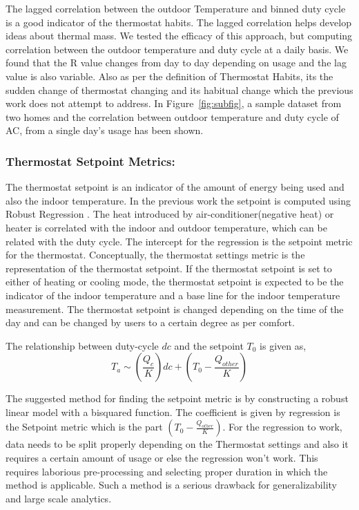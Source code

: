 \documentclass{sig-alternate}
\begin{document}
   

\indent The lagged correlation between the outdoor Temperature and binned duty cycle is a good indicator of the thermostat habits. The lagged correlation helps develop ideas about thermal mass. We tested the efficacy of this approach, but computing correlation between the outdoor temperature and duty cycle at a daily basis. We found that the R value changes from day to day depending on usage and the lag value is also variable. Also as per the definition of Thermostat Habits, its the sudden change of thermostat changing and its habitual change which the previous work does not attempt to address. In Figure~\ref{fig:subfig}, a sample dataset from two homes and the correlation between outdoor temperature and duty cycle of AC, from a single day's usage has been shown. 

\subsubsection{\textbf{Thermostat Setpoint Metrics:}} 

\indent The thermostat setpoint is an indicator of the amount of energy being used and also the indoor temperature. In the previous work the setpoint is computed using Robust Regression . The heat introduced by air-conditioner(negative heat) or heater is correlated with the indoor and outdoor temperature, which can be related with the duty cycle. The intercept for the regression is the setpoint metric for the thermostat. Conceptually, the thermostat settings metric is the representation of the thermostat setpoint. If the thermostat setpoint is set to either of heating or cooling mode, the thermostat setpoint is expected to be the indicator of the indoor temperature and a base line for the indoor temperature measurement. The thermostat setpoint is changed depending on the time of the day and can be changed by users to a certain degree as per comfort. 

\indent The relationship between duty-cycle $dc$ and the setpoint $T_0$ is given as, 
\begin{equation}
T_a \sim ( \frac{Q_c}{K} )dc + (T_0 - \frac{Q_{other}}{K})
\end{equation}

The suggested method for finding the setpoint metric is by constructing a robust linear model with a bisquared function. The coefficient is given by regression is the Setpoint metric which is the part  $(T_0 - \frac{Q_{other}}{K})$. For the regression to work, data needs to be split properly depending on the Thermostat settings and also it requires a certain amount of usage or else the regression won't work. This requires laborious pre-processing and selecting proper duration in which the method is applicable. Such a method is a serious drawback for generalizability and large scale analytics.
\end{document}
